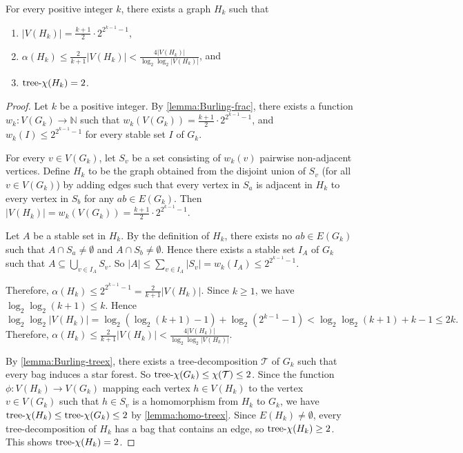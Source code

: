 \documentclass[a4paper, cleveref, autoref, thm-restate]{lipics-v2021}
\newcommand{\T}{\mathcal{T}}
\newcommand{\treex}{{\rm tree}\textnormal{-}\chi}
\begin{document}
\begin{lemma} \label{lemma:blowup-Burling}
For every positive integer $k$, there exists a graph $H_k$ such that 
    \begin{enumerate}
        \item $|V(H_k)| = \frac{k+1}{2} \cdot 2^{2^{k-1}-1}$,
        \item $\alpha(H_k) \leq \frac{2}{k+1}|V(H_k)| < \frac{4|V(H_k)|}{\log_2\log_2|V(H_k)|}$, and 
        \item $\treex(H_k) = 2$.
    \end{enumerate}
\end{lemma}
% 
\begin{proof}
Let $k$ be a positive integer.
By \cref{lemma:Burling-frac}, there exists a function $w_k\colon V(G_k) \rightarrow {\mathbb N}$ such that $w_k(V(G_k)) = \frac{k+1}{2} \cdot 2^{2^{k-1}-1}$, and $w_k(I) \leq 2^{2^{k-1}-1}$ for every stable set $I$ of $G_k$.

For every $v \in V(G_k)$, let $S_v$ be a set consisting of $w_k(v)$ pairwise non-adjacent vertices.
Define $H_k$ to be the graph obtained from the disjoint union of $S_v$ (for all $v \in V(G_k)$) by adding edges such that every vertex in $S_a$ is adjacent in $H_k$ to every vertex in $S_b$ for any $ab \in E(G_k)$.
Then $|V(H_k)| = w_k(V(G_k)) = \frac{k+1}{2} \cdot 2^{2^{k-1}-1}$.

Let $A$ be a stable set in $H_k$.
By the definition of $H_k$, there exists no $ab \in E(G_k)$ such that $A \cap S_a \neq \emptyset$ and $A \cap S_b \neq \emptyset$.
Hence there exists a stable set $I_A$ of $G_k$ such that $A \subseteq \bigcup_{v \in I_A}S_v$.
So $|A| \leq \sum_{v \in I_A}|S_v| = w_k(I_A) \leq 2^{2^{k-1}-1}$.

Therefore, $\alpha(H_k) \leq 2^{2^{k-1}-1} = \frac{2}{k+1}|V(H_k)|$.
Since $k \geq 1$, we have $\log_2\log_2(k+1) \leq k$.
Hence $$\log_2\log_2|V(H_k)| = \log_2(\log_2(k+1)-1) + \log_2(2^{k-1}-1) < \log_2\log_2(k+1) + k-1 \leq 2k.$$
Therefore, $\alpha(H_k) \leq \frac{2}{k+1}|V(H_k)| < \frac{4|V(H_k)|}{\log_2\log_2|V(H_k)|}$.

By \cref{lemma:Burling-treex}, there exists a tree-decomposition $\T$ of $G_k$ such that every bag induces a star forest.
So $\treex(G_k) \leq \chi(\T) \leq 2$.
Since the function $\phi \colon V(H_k) \rightarrow V(G_k)$ mapping each vertex $h \in V(H_k)$ to the vertex $v \in V(G_k)$ such that $h \in S_v$ is a homomorphism from $H_k$ to $G_k$, we have $\treex(H_k) \leq \treex(G_k) \leq 2$ by \cref{lemma:homo-treex}.
Since $E(H_k) \neq \emptyset$, every tree-decomposition of $H_k$ has a bag that contains an edge, so $\treex(H_k) \geq 2$.
This shows $\treex(H_k) = 2$.
\end{proof}
\end{document}
